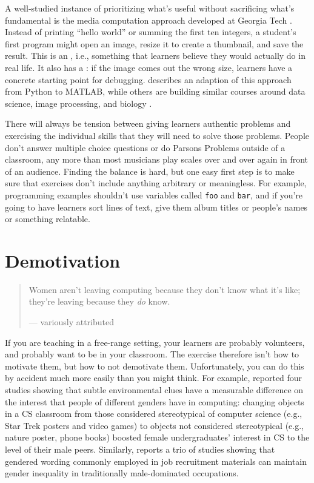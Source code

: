 A well-studied instance of prioritizing what's useful without
sacrificing what's fundamental is the media computation approach
developed at Georgia Tech \cite{Guzd2013}. Instead of printing ``hello
world'' or summing the first ten integers, a student's first program
might open an image, resize it to create a thumbnail, and save the
result. This is an , i.e.,
something that learners believe they would actually do in real life. It
also has a : if the
image comes out the wrong size, learners have a concrete starting point
for debugging. \cite{Lee2013} describes an adaption of this approach
from Python to MATLAB, while others are building similar courses around
data science, image processing, and biology
\cite{Dahl2018,Meys2018,Ritz2018}.

There will always be tension between giving learners authentic problems
and exercising the individual skills that they will need to solve those
problems. People don't answer multiple choice questions or do Parsons
Problems outside of a classroom, any more than most musicians play
scales over and over again in front of an audience. Finding the balance
is hard, but one easy first step is to make sure that exercises don't
include anything arbitrary or meaningless. For example, programming
examples shouldn't use variables called \texttt{foo} and \texttt{bar}, and if you're
going to have learners sort lines of text, give them album titles or
people's names or something relatable.

\section{Demotivation}\label{s:motivation-demotivation}

\begin{quote}

Women aren't leaving computing because they don't know what it's like;
they're leaving because they \emph{do} know.

--- variously attributed

\end{quote}

If you are teaching in a free-range setting, your learners are probably
volunteers, and probably want to be in your classroom. The exercise
therefore isn't how to motivate them, but how to not demotivate them.
Unfortunately, you can do this by accident much more easily than you
might think. For example, \cite{Cher2009} reported four studies
showing that subtle environmental clues have a measurable difference on
the interest that people of different genders have in computing:
changing objects in a CS classroom from those considered stereotypical
of computer science (e.g., Star Trek posters and video games) to objects
not considered stereotypical (e.g., nature poster, phone books) boosted
female undergraduates' interest in CS to the level of their male peers.
Similarly, \cite{Gauc2011} reports a trio of studies showing that
gendered wording commonly employed in job recruitment materials can
maintain gender inequality in traditionally male-dominated occupations.

